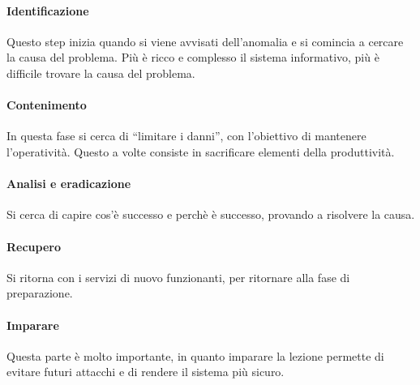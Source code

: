 \paragraph*{Identificazione} Questo step inizia quando si viene
avvisati dell'anomalia e si comincia a cercare la causa del problema. Più è
ricco e complesso il sistema informativo, più è difficile trovare la causa del
problema.

\paragraph*{Contenimento} In questa fase si cerca di ``limitare i danni'', con
l'obiettivo di mantenere l'operatività. Questo a volte consiste in sacrificare
elementi della produttività.

\paragraph*{Analisi e eradicazione} Si cerca di capire cos'è successo e perchè è
successo, provando a risolvere la causa.

\paragraph*{Recupero} Si ritorna con i servizi di nuovo funzionanti, per
ritornare alla fase di preparazione.

\paragraph*{Imparare} Questa parte è molto importante, in quanto imparare la
lezione permette di evitare futuri attacchi e di rendere il sistema più sicuro.
